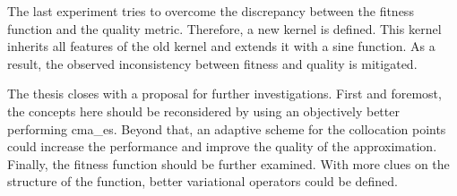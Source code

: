 \documentclass[./\jobname.tex]{subfiles}
\begin{document}
The last experiment tries to overcome the discrepancy between the fitness function and the quality metric. Therefore, a new kernel is defined. This kernel inherits all features of the old kernel and extends it with a sine function. As a result, the observed inconsistency between fitness and quality is mitigated. 

The thesis closes with a proposal for further investigations. First and foremost, the concepts here should be reconsidered by using an objectively better performing \gls{cma_es}. Beyond that, an adaptive scheme for the collocation points could increase the performance and improve the quality of the approximation. Finally, the fitness function should be further examined. With more clues on the structure of the function, better variational operators could be defined. 
\end{document}
